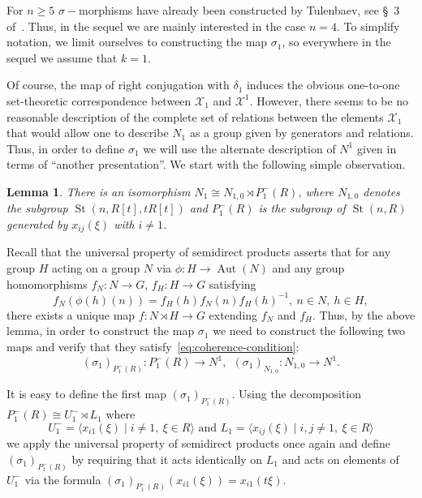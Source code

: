 \documentclass[oneside, 10pt]{amsart}
\DeclareMathOperator{\St}{St}
\DeclareMathOperator{\Aut}{Aut}
\numberwithin{equation}{section}
\newtheorem{lemma}{Lemma}
\numberwithin{lemma}{section}
\theoremstyle{definition}
\theoremstyle{remark}
\begin{document}
For $n\geq 5$ $\sigma-$morphisms have already been constructed by Tulenbaev, see \S~3 of~\cite{Tu83}.
Thus, in the sequel we are mainly interested in the case $n=4$.
To simplify notation, we limit ourselves to constructing the map $\sigma_1$, so everywhere in the sequel we assume that $k=1$. 

Of course, the map of right conjugation with $\delta_1$ induces the obvious one-to-one set-theoretic correspondence between $\mathcal{X}_1$ and $\mathcal{X}^1$. 
However, there seems to be no reasonable description of the complete set of relations between the elements $\mathcal{X}_1$ that would allow one to describe $N_1$
 as a group given by generators and relations.
Thus, in order to define $\sigma_1$ we will use the alternate description of $N^1$ given in terms of ``another presentation''.
We start with the following simple observation.
\begin{lemma} \label{lem:n1-decomp} There is an isomorphism $N_1 \cong N_{1,0} \rtimes P_1^-(R)$, where $N_{1,0}$ denotes the subgroup $\St(n, R[t], tR[t])$
 and $P_1^-(R)$ is the subgroup of $\St(n, R)$ generated by $x_{ij}(\xi)$ with $i\neq 1$.
\end{lemma}

Recall that the universal property of semidirect products asserts that for any group $H$ acting on a group $N$ via $\phi \colon H \to \Aut(N)$ and any group homomorphisms
 $f_N\colon N \to G$, $f_H\colon H \to G$ satisfying 
\begin{equation} \label{eq:coherence-condition} f_N(\phi(h)(n)) = f_H(h) f_N(n) f_H(h)^{-1},\ n\in N,\ h\in H,\end{equation} there exists a unique map $f\colon N \rtimes H \to G$
 extending $f_N$ and $f_H$. 
Thus, by the above lemma, in order to construct the map $\sigma_1$ we need to construct the following two maps and verify that they satisfy~\eqref{eq:coherence-condition}:
\[ (\sigma_1)_{P_1^-(R)} \colon P_1^-(R) \to N^1, \ \ (\sigma_1)_{N_{1,0}} \colon N_{1,0} \to N^1.\]

It is easy to define the first map $(\sigma_1)_{P_1^-(R)}$.
Using the decomposition $P_1^-(R) \cong U^-_1 \rtimes L_1$ where 
\[U^-_1 = \langle x_{i1}(\xi) \mid i\neq 1,\ \xi\in R \rangle \text{ and } L_1 = \langle x_{ij}(\xi) \mid i,  j \neq 1,\ \xi\in R\rangle \]
we apply the universal property of semidirect products once again 
 and define $(\sigma_1)_{P_1^-(R)}$ by requiring that it acts identically on $L_1$ 
and acts on elements of $U^-_1$ via the formula $(\sigma_1)_{P_1^-(R)}(x_{i1}(\xi))= x_{i1}(t\xi)$.
\end{document}
